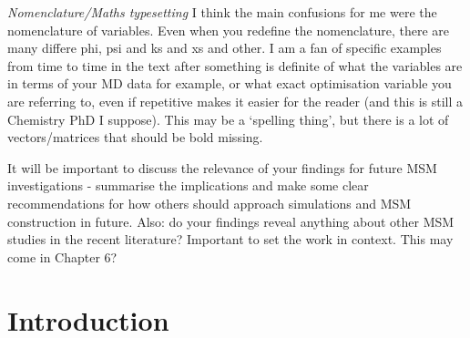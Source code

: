 \emph{Nomenclature/Maths typesetting}
I think the main confusions for me were the nomenclature of variables. Even when you redefine the nomenclature, there are many differe phi, psi and ks and xs and other. I am a fan of specific examples from time to time in the text after something is definite of what the variables are in terms of your MD data for example, or what exact optimisation variable you are referring to, even if repetitive makes it easier for the reader (and this is still a Chemistry PhD I suppose). This may be a ‘spelling thing’, but there is a lot of vectors/matrices that should be bold missing. 


It will be important to discuss the relevance of your findings for future MSM investigations - summarise the implications and make some clear recommendations for how others should approach simulations and MSM construction in future. Also: do your findings reveal anything about other MSM studies in the recent literature? Important to set the work in context. This may come in Chapter 6?

\section{Introduction}

